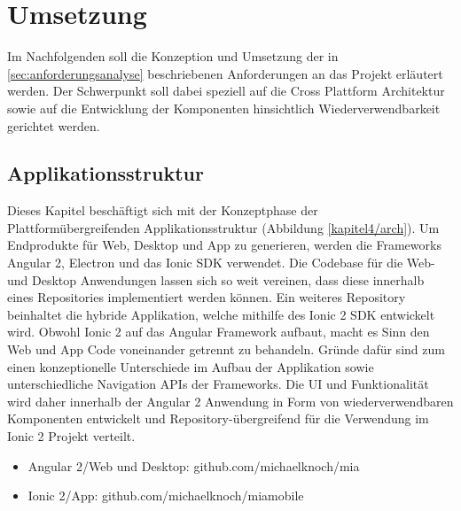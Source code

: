 
\chapter{Umsetzung}
\label{chap:umsetzung}

Im Nachfolgenden soll die Konzeption und Umsetzung der in \ref{sec:anforderungsanalyse}
beschriebenen Anforderungen an das Projekt \projectname{} erläutert werden.
Der Schwerpunkt soll dabei speziell auf die Cross Plattform Architektur sowie auf die
Entwicklung der Komponenten hinsichtlich Wiederverwendbarkeit gerichtet werden.


\section{Applikationsstruktur}

Dieses Kapitel beschäftigt sich mit der Konzeptphase der Plattformübergreifenden Applikationsstruktur
(Abbildung \ref{kapitel4/arch}).
Um Endprodukte für Web, Desktop und App zu generieren, werden die Frameworks Angular 2, Electron und das
Ionic \ac{SDK} verwendet. Die Codebase für die Web- und Desktop Anwendungen lassen sich so weit vereinen,
dass diese innerhalb eines Repositories implementiert werden können.
Ein weiteres Repository beinhaltet die hybride Applikation,
welche mithilfe des Ionic 2 \ac{SDK} entwickelt wird. Obwohl Ionic 2 auf das Angular Framework aufbaut,
macht es Sinn den Web und App Code voneinander getrennt zu behandeln.
Gründe dafür sind zum einen konzeptionelle Unterschiede im Aufbau der Applikation
sowie unterschiedliche Navigation APIs der Frameworks.
Die \ac{UI} und Funktionalität wird daher innerhalb der Angular 2
Anwendung in Form von wiederverwendbaren Komponenten entwickelt und
Repository-übergreifend für die Verwendung im Ionic 2 Projekt verteilt.

\begin{itemize}
  \item Angular 2/Web und Desktop: github.com/michaelknoch/mia
  \item Ionic 2/App: github.com/michaelknoch/miamobile
\end{itemize}



